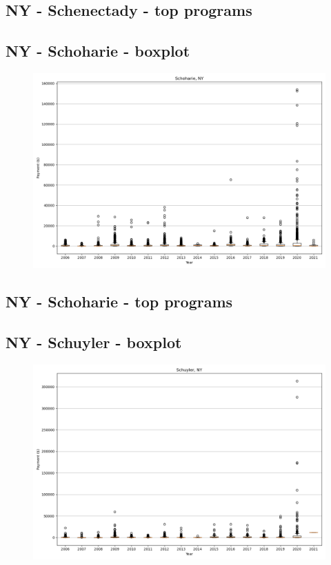 \subsection*{NY - Schenectady - top programs}

\newpage
\subsection*{NY - Schoharie - boxplot}
\begin{figure}[h]
\centering
\includegraphics[width=7in]{../output/boxplots/counties/Schoharie-NY_boxplot.png}
\end{figure}


\subsection*{NY - Schoharie - top programs}

\newpage
\subsection*{NY - Schuyler - boxplot}
\begin{figure}[h]
\centering
\includegraphics[width=7in]{../output/boxplots/counties/Schuyler-NY_boxplot.png}
\end{figure}


